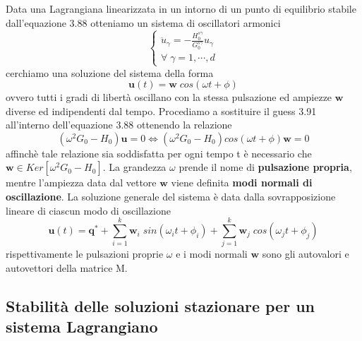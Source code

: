 Data una Lagrangiana linearizzata in un intorno di un punto di equilibrio stabile dall'equazione 3.88 otteniamo un sistema di oscillatori armonici
\begin{equation}
	\left \{ \begin{array}{l}
	\ddot{u}_{\gamma} = - \frac{H_0^{s \gamma }}{G_0^{s \gamma }}u_{\gamma} \\
	\forall \; \gamma = 1, \cdots, d
	\end{array} \right.
\end{equation}
cerchiamo una soluzione del sistema della forma 
\begin{equation}
	\bm{u}(t) = \bm{w}\; cos(\omega t + \phi) 
\end{equation}
ovvero tutti i gradi di libert\`{a} oscillano con la stessa pulsazione ed ampiezze $\bm{w}$ diverse ed indipendenti dal tempo. Procediamo a sostituire il guess 3.91 all'interno dell'equazione 3.88 ottenendo la relazione 
\begin{equation}
	(\omega^2 G_0 - H_0)\bm{u} = 0 \iff (\omega^2 G_0 - H_0)cos(\omega t + \phi) \bm{w} = 0 
\end{equation}
affinch\`{e} tale relazione sia soddisfatta per ogni tempo t \`{e} necessario che $\bm{w} \in Ker[\omega^2 G_0 -H_0]$.
\newline
La grandezza $\omega$ prende il nome di \textbf{pulsazione propria}, mentre l'ampiezza data dal vettore $\bm{w}$ viene definita \textbf{modi normali di oscillazione}. La soluzione generale del sistema \`{e} data dalla sovrapposizione lineare di ciascun modo di oscillazione 
\begin{equation}
	\bm{u}(t) =  \bm{q}^{*} + \sum_{i=1}^{k}   \bm{w}_{i} \; sin(\omega_i t + \phi_i)  + \sum_{j=1}^{k}  \bm{w}_{j} \; cos(\omega_j t + \phi_j)
\end{equation}
rispettivamente le pulsazioni proprie $\omega$ e i modi normali $\bm{w}$ sono gli autovalori e autovettori della matrice M.
\subsection{Stabilit\`{a} delle soluzioni stazionare per un sistema Lagrangiano}

